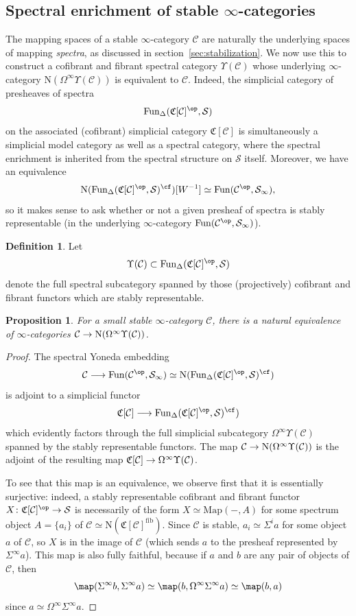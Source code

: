 \documentclass{amsart}
\renewcommand{\to}{\mathchoice{\longrightarrow}{\rightarrow}{\rightarrow}{\rightarrow}}
\newcommand{\cS}{{\mathcal S}}
\let\catsymbfont\mathcal
\newcommand{\aC}{{\catsymbfont{C}}}
\newcommand{\aS}{{\catsymbfont{S}}}
\newcommand{\C}{\catsymbfont{C}}
\newcommand{\N}{\mathrm{N}}
\newcommand{\Fun}{\mathrm{Fun}} %
\newcommand{\Map}{\mathrm{Map}}%
\newcommand{\ispec}{\aS_{\infty}}
\renewcommand{\i}{\infty}
\newcommand{\spect}{\Upsilon}
\numberwithin{equation}{section}
\newtheorem{proposition}[equation]{Proposition}
\theoremstyle{definition}
\newtheorem{definition}[equation]{Definition}
\begin{document}
\subsection{Spectral enrichment of stable $\i$-categories}
The mapping spaces of a stable $\i$-category $\aC$ are naturally the underlying spaces of mapping {\em spectra}, as discussed in section~\ref{sec:stabilization}.
We now use this to construct a cofibrant and fibrant
spectral category $\Upsilon(\C)$ whose underlying $\infty$-category
$\N(\Omega^\infty\Upsilon(\C))$ is equivalent to $\C$.  Indeed, the
simplicial category of presheaves of spectra
\[
\Fun_\Delta(\mathfrak{C}[\C]^{\op},\cS)
\]
on the associated (cofibrant) simplicial category $\mathfrak{C}[\C]$
is simultaneously a simplicial model category as well as a spectral
category, where the spectral enrichment is inherited from the
spectral structure on $\cS$ itself.
Moreover, we have an equivalence
\[
\N(\Fun_\Delta(\mathfrak{C}[\C]^{\op},\cS)^{\cf})[W^{-1}]\simeq\Fun(\C^{\op},\ispec),
\]
so it makes sense to ask whether or not a given presheaf of spectra is
stably representable (in the underlying $\infty$-category
$\Fun(\C^{\op},\ispec)$). 

\begin{definition}
Let
\[
\spect(\C) \subset \Fun_\Delta(\mathfrak{C}[\C]^{\op},\cS)
\]
denote the full spectral subcategory spanned by those (projectively)
cofibrant and fibrant functors which are stably representable.
\end{definition}

\begin{proposition}\label{prop:Nomega}
For a small stable $\i$-category $\C$, there is a natural equivalence
of $\infty$-categories $\C\to \N(\Omega^\infty \spect(\C))$.
\end{proposition}

\begin{proof}
The spectral Yoneda embedding
\[
\C\to\Fun(\C^{\op},\ispec)\simeq\N(\Fun_\Delta(\mathfrak{C}[\C]^{\op},\cS)^{\cf})
\]
is adjoint to a simplicial functor
\[
\mathfrak{C}[\C]\to\Fun_\Delta(\mathfrak{C}[\C]^{\op},\cS)^{\cf})
\]
which evidently factors through the full simplicial subcategory
$\Omega^\infty \spect(\C)$ spanned by the stably representable functors. 
The map $\C\to\N(\Omega^\infty \spect(\C))$ is the adjoint of the resulting
map $\mathfrak{C}[\C]\to\Omega^\infty \spect(\C)$. 

To see that this map is an equivalence, we observe first that it is
essentially surjective: indeed, a stably representable cofibrant and
fibrant functor $X\colon\mathfrak{C}[\C]^{\op}\to\cS$ is necessarily of the form
$X\simeq\Map(-,A)$ for some spectrum object $A=\{a_i\}$ of
$\C\simeq\N(\mathfrak{C}[\C]^{\mathrm{fib}})$.  Since $\C$ is stable,
$a_i\simeq\Sigma^i a$ for some object $a$ of $\C$, so $X$ is in the
image of $\C$ (which sends $a$ to the presheaf represented by
$\Sigma^\infty a$).  This map is also fully faithful, because if $a$
and $b$ are any pair of objects of $\C$, then
\[
\map(\Sigma^\i b,\Sigma^\i a)\simeq\map(b,\Omega^\i\Sigma^\i a)\simeq\map(b,a)
\]
since $a\simeq\Omega^\i\Sigma^\i a$.
\end{proof}
\end{document}
